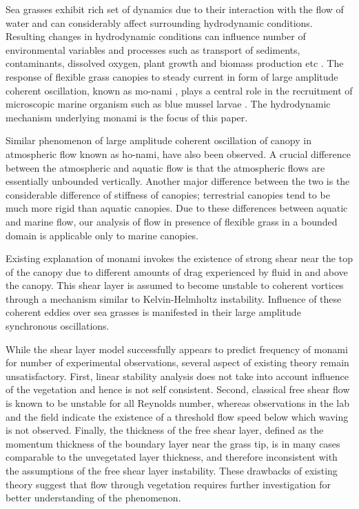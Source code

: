 \documentclass[aps,prl,twocolumn,showpacs,superscriptaddress,groupedaddress,10pt]{revtex4-1}  %
\begin{document}
Sea grasses exhibit rich set of dynamics due to their interaction with the flow of water and can considerably affect surrounding hydrodynamic conditions.
Resulting changes in hydrodynamic conditions can influence number of environmental variables and processes such as 
transport of sediments, contaminants, dissolved oxygen, plant growth and biomass production etc \cite{Fonseca87,Nepf99}. 
The response of flexible grass canopies to steady current in form of large amplitude coherent oscillation, known as mo-nami \cite{AckermanOkubo93}, plays a central role
in the recruitment of microscopic marine organism such as blue mussel larvae \cite{Grizzle96}. The hydrodynamic mechanism underlying monami is the focus of this paper. 

Similar phenomenon of large amplitude coherent oscillation of canopy in atmospheric flow known as ho-nami\cite{Inoue56,Raupach96}, have also been observed.
A crucial difference between the atmospheric and aquatic flow is that the atmospheric flows are essentially unbounded vertically\cite{Vivoni98,Nepf00}. Another major
difference between the two is the considerable difference of stiffness of canopies; terrestrial canopies tend to be much more rigid than aquatic canopies\cite{Vivoni98,Ghisal02}.
Due to these differences between aquatic and marine flow, our analysis of flow in presence of flexible grass in a bounded domain is applicable only to marine canopies. 
  
Existing explanation of monami invokes the existence of strong shear near the top of the canopy \cite{Ghisal02,Raupach96} due to
different amounts of drag experienced by fluid in and above the canopy. This shear layer is assumed to become unstable to coherent vortices through a mechanism similar to 
Kelvin-Helmholtz instability. Influence of these coherent eddies over sea grasses is manifested in their large amplitude synchronous oscillations.


While the shear layer model successfully appears to predict frequency of monami for number of experimental observations, several aspect of existing theory remain unsatisfactory. 
First, linear stability analysis\cite{Raupach96} does not take into account influence of the vegetation and hence is not self consistent. Second, classical free shear flow 
is known to be unstable for all Reynolds number\cite{drazin}, whereas observations in the lab\cite{Ghisal02} and the field\cite{Grizzle96} indicate the existence of a threshold flow speed below which waving is not observed. Finally, the thickness of the free shear layer, defined as the momentum thickness of the boundary layer near the grass tip, is in many cases comparable to the unvegetated layer thickness,
 and therefore inconsistent with the assumptions of the free shear layer instability. These drawbacks of existing theory suggest that flow through vegetation requires further investigation for better understanding of the phenomenon.
\end{document}
